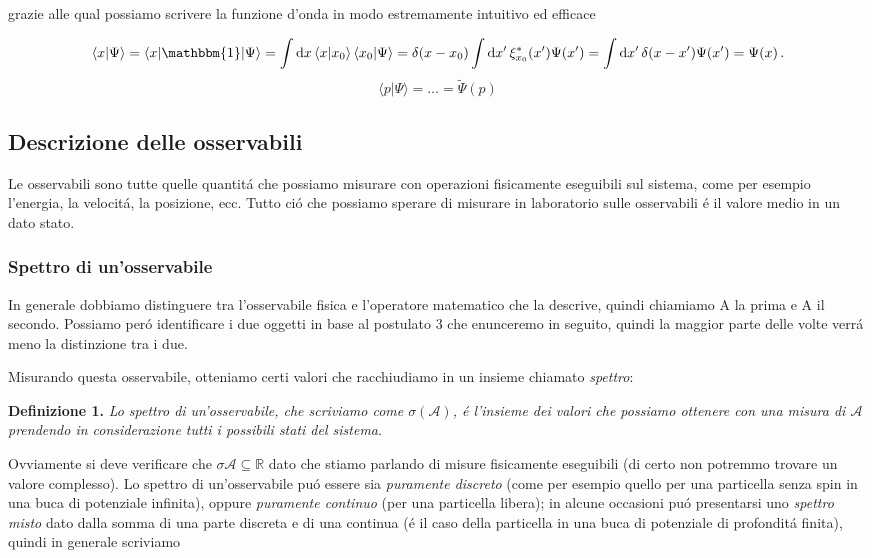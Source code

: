 grazie alle qual possiamo scrivere la funzione d'onda in modo estremamente intuitivo ed efficace
 
$$\langle x|\Psi\rangle=\langle x|\mathbbm{1}|\Psi\rangle=\int\mathrm{d}x\,\langle x|x_{0}\rangle\,\langle x_{0}|\Psi\rangle=\delta(x-x_{0})\int\mathrm{d}x^{\prime}\,\xi_{x_{0}}^{*}(x^{\prime})\Psi(x^{\prime})=\int\mathrm{d}x^{\prime}\,\delta(x-x^{\prime})\Psi(x^{\prime})=\Psi(x)\,.$$
$$\langle p|\Psi\rangle=\ldots={\tilde{\Psi}}(p)$$

\subsection{Descrizione delle osservabili}

Le osservabili sono tutte quelle quantit\'a che possiamo misurare con operazioni fisicamente eseguibili sul sistema, come per esempio l'energia, la velocit\'a, la posizione, ecc. Tutto ci\'o che possiamo sperare di misurare in laboratorio sulle osservabili \'e il valore medio in un dato stato.

\subsubsection{Spettro di un'osservabile}

In generale dobbiamo distinguere tra l'osservabile fisica e l'operatore matematico che la descrive, quindi chiamiamo A la prima e A il secondo. Possiamo per\'o identificare i due oggetti in base al postulato 3 che enunceremo in seguito, quindi la maggior parte delle volte verr\'a meno la distinzione tra i due.

Misurando questa osservabile, otteniamo certi valori che racchiudiamo in un insieme chiamato \textit{spettro}:

\textbf{Definizione 1.} \textit{Lo spettro di un'osservabile, che scriviamo come $\sigma(\mathcal{A})$, \'e l'insieme dei valori che possiamo ottenere con una misura di $\mathcal{A}$ prendendo in considerazione tutti i possibili stati del sistema}.

Ovviamente si deve verificare che $\sigma \mathcal{A} \subseteq \mathbb{R}$ dato che stiamo parlando di misure fisicamente eseguibili (di certo non potremmo trovare un valore complesso). Lo spettro di un'osservabile pu\'o essere sia \textit{puramente discreto} (come per esempio quello per una particella senza spin in una buca di potenziale infinita), oppure \textit{puramente continuo} (per una particella libera); in alcune occasioni pu\'o presentarsi uno \textit{spettro misto} dato dalla somma di una parte discreta e di una continua (\'e il caso della particella in una buca di potenziale di profondit\'a finita),
quindi in generale scriviamo 

